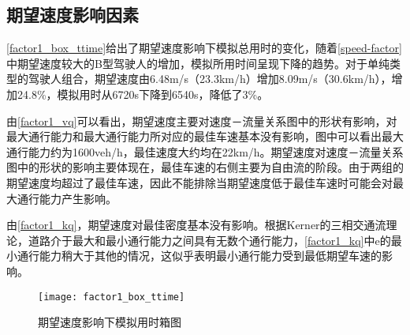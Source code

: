     \renewcommand{\topfraction}{0.9}	%
    \renewcommand{\bottomfraction}{0.8}	%
    \setcounter{topnumber}{2}
    \setcounter{bottomnumber}{2}
    \setcounter{totalnumber}{4}     %
    \setcounter{dbltopnumber}{2}    %
    \renewcommand{\dbltopfraction}{0.9}	%
    \renewcommand{\textfraction}{0.00}	%
    \renewcommand{\floatpagefraction}{0.7}	%
    \renewcommand{\dblfloatpagefraction}{0.7}	%



\subsection{期望速度影响因素}
\autoref{factor1_box_ttime}给出了期望速度影响下模拟总用时的变化，随着\autoref{speed-factor}中期望速度较大的B型驾驶人的增加，模拟所用时间呈现下降的趋势。对于单纯类型的驾驶人组合，期望速度由6.48m/s（23.3km/h）增加8.09m/s（30.6km/h），增加24.8\%，模拟用时从6720s下降到6540s，降低了3\%。

由\autoref{factor1_vq}可以看出，期望速度主要对速度－流量关系图中的形状有影响，对最大通行能力和最大通行能力所对应的最佳车速基本没有影响，图中可以看出最大通行能力约为1600veh/h，最佳速度大约均在22km/h。期望速度对速度－流量关系图中的形状的影响主要体现在，最佳车速的右侧主要为自由流的阶段。由于两组的期望速度均超过了最佳车速，因此不能排除当期望速度低于最佳车速时可能会对最大通行能力产生影响。

由\autoref{factor1_kq}，期望速度对最佳密度基本没有影响。根据Kerner的三相交通流理论，道路介于最大和最小通行能力之间具有无数个通行能力，\autoref{factor1_kq}中e的最小通行能力稍大于其他的情况，这似乎表明最小通行能力受到最低期望车速的影响。

\begin{figure}[htb]
\begin{center}
\texttt{[image: factor1\_box\_ttime]}
\caption{期望速度影响下模拟用时箱图}
\label{factor1_box_ttime}
\end{center}
\end{figure}


